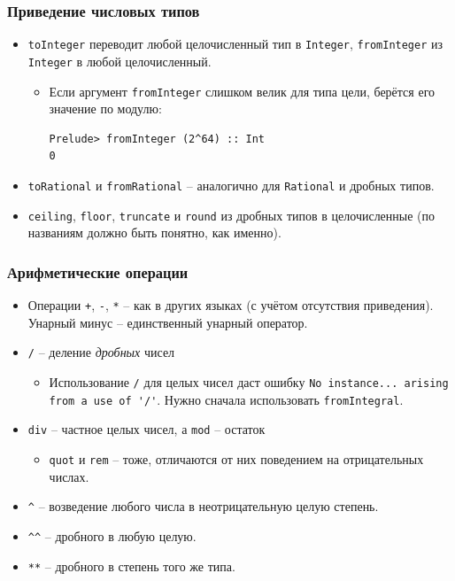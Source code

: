 \documentclass[11pt]{beamer}
\begin{document}
\begin{frame}[fragile]
\frametitle{Приведение числовых типов}
\begin{itemize}
    \item \lstinline|toInteger| переводит любой целочисленный тип в \lstinline|Integer|, \lstinline|fromInteger| из \lstinline|Integer| в любой целочисленный.
    \begin{itemize}
        \item Если аргумент \lstinline|fromInteger| слишком велик для типа цели, берётся его значение по модулю:
        \begin{lstlisting}
Prelude> fromInteger (2^64) :: Int
0
\end{lstlisting}
    \end{itemize}
    \item \lstinline|toRational| и \lstinline|fromRational| -- аналогично для \lstinline|Rational| и дробных типов.
    \item \lstinline|ceiling|, \lstinline|floor|, \lstinline|truncate| и \lstinline|round| из дробных типов в целочисленные (по названиям должно быть понятно, как именно).
\end{itemize}
\end{frame}

\begin{frame}[fragile]
\frametitle{Арифметические операции}
\begin{itemize}
    \item Операции \lstinline|+|, \lstinline|-|, \lstinline|*| -- как в других языках (с учётом отсутствия приведения).
    Унарный минус -- единственный унарный оператор.
    \item \lstinline|/| -- деление \emph{дробных} чисел
    \begin{itemize}
        \item Использование \lstinline|/| для целых чисел даст ошибку \lstinline|No instance... arising from a use of '/'|. Нужно сначала использовать \lstinline|fromIntegral|.
    \end{itemize}        
    \item \lstinline|div| -- частное целых чисел, а \lstinline|mod| -- остаток
    \begin{itemize}
        \item
 \lstinline|quot| и \lstinline|rem| -- тоже, отличаются от них поведением на отрицательных числах.
    \end{itemize}        
   \item \lstinline|^| -- возведение любого числа в неотрицательную  целую степень. 
       \item \lstinline|^^| -- дробного в любую целую. \item \lstinline|**| -- дробного в степень того же типа.
\end{itemize}
\end{frame}
\end{document}

